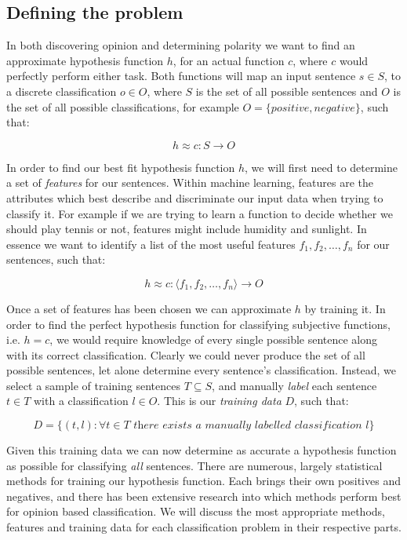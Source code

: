 \subsection{Defining the problem}

In both discovering opinion and determining polarity we want to find an approximate hypothesis function $h$, for an actual function $c$, where $c$ would perfectly perform either task. Both functions will map an input sentence $s\in S$, to a discrete classification $o\in O$, where $S$ is the set of all possible sentences and $O$ is the set of all possible classifications, for example $O=\{positive, negative\}$, such that:

\begin{equation}
	h \approx c:S \rightarrow O
\end{equation}

In order to find our best fit hypothesis function $h$, we will first need to determine a set of \emph{features} for our sentences. Within machine learning, features are the attributes which best describe and discriminate our input data when trying to classify it. For example if we are trying to learn a function to decide whether we should play tennis or not, features might include humidity and sunlight. In essence we want to identify a list of the most useful features $f_1, f_2,\dots,f_n$ for our sentences, such that:
	
\begin{equation}
	h \approx c : \langle f_1, f_2,\dots,f_n \rangle \rightarrow O
\end{equation}

Once a set of features has been chosen we can approximate $h$ by training it. In order to find the perfect hypothesis function for classifying subjective functions, i.e. $h=c$, we would require knowledge of every single possible sentence along with its correct classification. Clearly we could never produce the set of all possible sentences, let alone determine every sentence's classification. Instead, we select a sample of training sentences $T \subseteq S$, and manually \emph{label} each sentence $t \in T$ with a classification $l \in O$. This is our \emph{training data} $D$, such that:

\begin{equation}
	D = \{(t, l) : \forall t \in T \textit{ there exists a manually labelled classification $l$} \}
\end{equation}

Given this training data we can now determine as accurate a hypothesis function as possible for classifying \emph{all} sentences. There are numerous, largely statistical methods for training our hypothesis function. Each brings their own positives and negatives, and there has been extensive research \cite{Pang:2004us} into which methods perform best for opinion based classification. We will discuss the most appropriate methods, features and training data for each classification problem in their respective parts.

